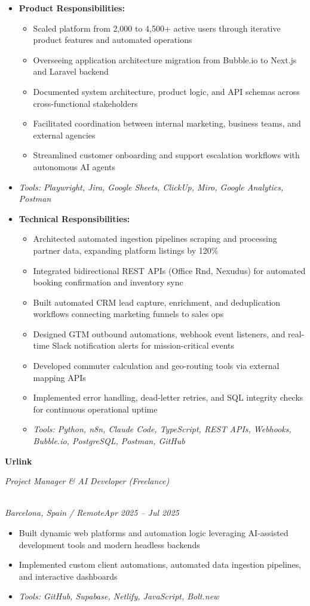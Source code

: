 \documentclass[a4paper,10pt]{article}
\newcommand{\role}[4]{\vspace{2pt}\noindent\hspace{0.6em}\parbox[t]{0.38\textwidth}{\raggedright\textbf{#1}}\hfill\parbox[t]{0.58\textwidth}{\raggedleft\textit{#2}}\\{\textit{#3}\hfill\textit{#4}}\vspace{1pt}}
\begin{document}
\begin{itemize}
\item \textbf{Product Responsibilities:}
\begin{itemize}[label=--]
\item Scaled platform from 2,000 to 4,500+ active users through iterative product features and automated operations
\item Overseeing application architecture migration from Bubble.io to Next.js and Laravel backend
\item Documented system architecture, product logic, and API schemas across cross-functional stakeholders
\item Facilitated coordination between internal marketing, business teams, and external agencies
\item Streamlined customer onboarding and support escalation workflows with autonomous AI agents
\end{itemize}
\item \textit{Tools: Playwright, Jira, Google Sheets, ClickUp, Miro, Google Analytics, Postman}
\item \textbf{Technical Responsibilities:}
\begin{itemize}[label=--]
\item Architected automated ingestion pipelines scraping and processing partner data, expanding platform listings by 120\%
\item Integrated bidirectional REST APIs (Office Rnd, Nexudus) for automated booking confirmation and inventory sync
\item Built automated CRM lead capture, enrichment, and deduplication workflows connecting marketing funnels to sales ops
\item Designed GTM outbound automations, webhook event listeners, and real-time Slack notification alerts for mission-critical events
\item Developed commuter calculation and geo-routing tools via external mapping APIs
\item Implemented error handling, dead-letter retries, and SQL integrity checks for continuous operational uptime
\item \textit{Tools: Python, n8n, Claude Code, TypeScript, REST APIs, Webhooks, Bubble.io, PostgreSQL, Postman, GitHub}
\end{itemize}
\end{itemize}

\role{Urlink}{Project Manager \& AI Developer (Freelance)}{Barcelona, Spain / Remote}{Apr 2025 -- Jul 2025}
\begin{itemize}
\item Built dynamic web platforms and automation logic leveraging AI-assisted development tools and modern headless backends
\item Implemented custom client automations, automated data ingestion pipelines, and interactive dashboards
\item \textit{Tools: GitHub, Supabase, Netlify, JavaScript, Bolt.new}
\end{itemize}
\end{document}
